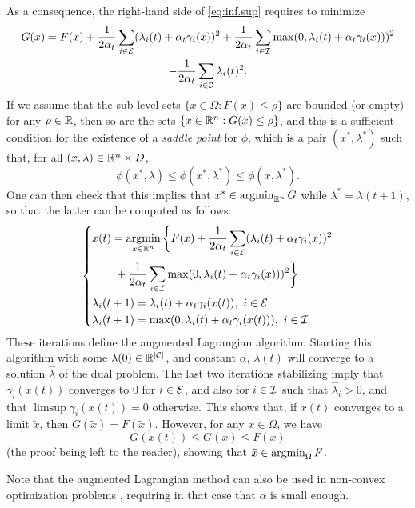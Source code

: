 As a consequence, the right-hand side of \cref{eq:inf.sup} requires to minimize
\begin{multline*}
G(x) = F(x) + \frac{1}{2\alpha_t} \sum_{i\in{\mathcal E}} (\lambda_i(t) + \alpha_t \gamma_i(x))^2 + \frac{1}{2\alpha_t} \sum_{i\in{\mathcal I}} \max(0,\lambda_i(t) + \alpha_t \gamma_i(x)))^2\\
-  \frac{1}{2\alpha_t}\sum_{i\in {\mathcal C}} \lambda_i(t)^2.
\end{multline*}
If we assume that the sub-level sets $\{x\in \Omega: F(x) \leq \rho\}$ are bounded (or empty) for any $\rho\in {\mathbb{R}}$, then so are the sets $\{x\in {\mathbb{R}}^n: G(x) \leq \rho\}$, and this is a sufficient condition for the existence of a {\em saddle point} for $\phi$, which is a pair $(x^*, \lambda^*)$ such that, for all $(x, \lambda) \in {\mathbb{R}}^n \times D$, 
\[
\phi(x^*, \lambda) \leq \phi(x^*, \lambda^*) \leq \phi(x, \lambda^*).
\]
One can then check that this implies that $x^*\in \operatorname*{argmin}_{{\mathbb{R}}^n} G$ while $\lambda^* = \lambda(t+1)$, so that the latter can be computed as follows:
\begin{equation}
\left\{
\begin{aligned}
&x(t) = \operatorname*{argmin}_{x\in {\mathbb{R}}^n}\bigg\{ F(x) + \frac{1}{2\alpha_t} \sum_{i\in{\mathcal E}} (\lambda_i(t) + \alpha_t \gamma_i(x))^2 \\
& \qquad + \frac{1}{2\alpha_t} \sum_{i\in{\mathcal I}} \max(0,\lambda_i(t) + \alpha_t \gamma_i(x)))^2\bigg\} \\
&\lambda_i (t+1)= \lambda_i (t) + \alpha_t \gamma_i(x(t)),\ i\in {\mathcal E}\\
&\lambda_i (t+1) = \max(0, \lambda_i (t) + \alpha_t \gamma_i(x(t))),\ i\in{\mathcal I}
\end{aligned}
\right.
\label{eq:augmented.lagrangian}
\end{equation}
These iterations define the augmented Lagrangian algorithm. Starting this algorithm  with some $\lambda(0)\in {\mathbb{R}}^{|{\mathcal C}|}$, and constant $\alpha$, $\lambda(t)$ will converge to a solution $\hat \lambda$ of the dual problem. The last two iterations stabilizing imply that $\gamma_i(x(t))$ converges to 0 for $i\in {\mathcal E}$, and also  for $i\in {\mathcal I}$ such that $\hat \lambda_i >0$, and that $\limsup \gamma_i(x(t)) = 0$ otherwise. This shows that, if $x(t)$ converges to a limit $\tilde x$, then $G(\tilde x) = F(\tilde x)$.
However, for any $x\in \Omega$, we have
\[
G(x(t)) \leq G(x)\leq F(x)
\]
(the proof being left to the reader),
showing that $\tilde x\in \operatorname*{argmin}_\Omega F$.

Note that the augmented Lagrangian method can also be used in non-convex optimization problems \cite{nocedal2006nonlinear}, requiring in that case that $\alpha$ is small enough.



